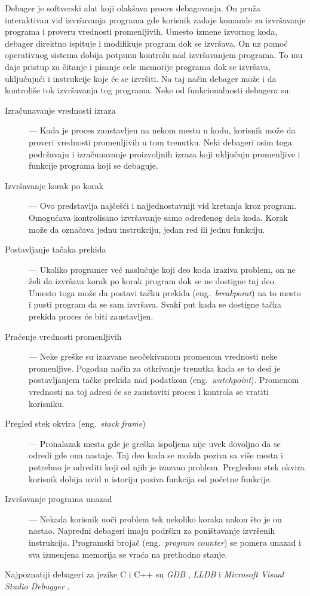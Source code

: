 \documentclass[12pt,oneside]{memoir}
\begin{document}
Debager je softverski alat koji olakšava proces debagovanja.
On pruža interaktivan vid izvršavanja programa gde korisnik zadaje komande za izvršavanje programa i proveru vrednosti promenljivih.
Umesto izmene izvornog koda, debager direktno ispituje i modifikuje program dok se izvršava.
On uz pomoć operativnog sistema dobija potpunu kontrolu nad izvršavanjem programa.
To mu daje pristup za čitanje i pisanje cele memorije programa dok se izvršava, uključujući i instrukcije koje će se izvršiti.
Na taj način debager može i da kontroliše tok izvršavanja tog programa.
Neke od funkcionalnosti debagera su: %
\begin{description}
  \item[Izračunavanje vrednosti izraza] --- Kada je proces zaustavljen na nekom mestu u kodu, korisnik može da proveri vrednosti promenljivih u tom trenutku. Neki debageri osim toga podržavaju i izračunavanje proizvoljnih izraza koji uključuju promenljive i funkcije programa koji se debaguje.
  \item[Izvršavanje korak po korak] --- Ovo predstavlja najčešći i najjednostavniji vid kretanja kroz program. Omogućava kontrolisano izvršavanje samo određenog dela koda. Korak može da označava jednu instrukciju, jedan red ili jednu funkciju. %
  \item[Postavljanje tačaka prekida] --- Ukoliko programer već naslućuje koji deo koda izaziva problem, on ne želi da izvršava korak po korak program dok se ne dostigne taj deo. Umesto toga može da postavi tačku prekida (eng.~{\em breakpoint}) na to mesto i pusti program da se sam izvršava. Svaki put kada se dostigne tačka prekida proces će biti zaustavljen. %
  \item[Praćenje vrednosti promenljivih] --- Neke greške su izazvane neočekivanom promenom vrednosti neke promenljive. Pogodan način za otkrivanje trenutka kada se to desi je postavljanjem tačke prekida nad podatkom (eng.~{\em watchpoint}). Promenom vrednosti na toj adresi će se zaustaviti proces i kontrola se vratiti korisniku.
  \item[Pregled stek okvira (eng.~{\em stack frame})] --- Pronalazak mesta gde je greška ispoljena nije uvek dovoljno da se odredi gde ona nastaje. Taj deo koda se možda poziva sa više mesta i potrebno je odrediti koji od njih je izazvao problem. Pregledom stek okvira korisnik dobija uvid u istoriju poziva funkcija od početne funkcije.
  \item[Izvršavanje programa unazad] --- Nekada korisnik uoči problem tek nekoliko koraka nakon što je on nastao. Napredni debageri imaju podršku za poništavanje izvršenih instrukcija. Programski brojač (eng.~{\em program counter}) se pomera unazad i sva izmenjena memorija se vraća na prethodno stanje.
\end{description}
Najpoznatiji debageri za jezike C i C++ su \textit{GDB} \cite{gdb}, \textit{LLDB} \cite{lldb} i \textit{Microsoft Visual Studio Debugger} \cite{msvcd}.
\end{document}
